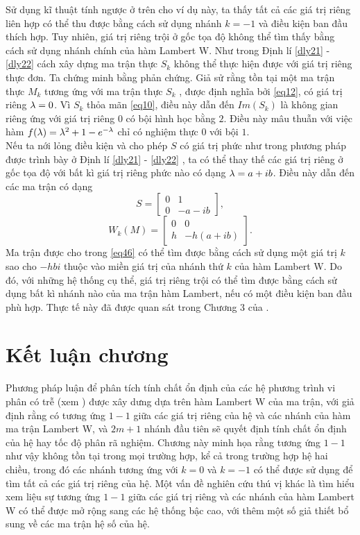 Sử dụng kĩ thuật tính ngược ở trên cho ví dụ này, ta thấy tất cả các giá trị riêng liên hợp có thể thu được bằng cách sử dụng nhánh $k = -1$ và điều kiện ban đầu thích hợp. Tuy nhiên, giá trị riêng trội ở gốc tọa độ không thể tìm thấy bằng cách sử dụng nhánh chính của hàm Lambert W. Như trong Định lí \ref{dly21} - \ref{dly22} cách xây dựng ma trận thực $S_k$ không thể thực hiện được với giá trị riêng thực đơn. Ta chứng minh bằng phản chứng. Giả sử rằng tồn tại một ma trận thực $M_k$ tương ứng với ma trận thực $S_k$ , được định nghĩa bởi \eqref{eq12}, có giá trị riêng $\lambda = 0$. Vì $S_k$ thỏa mãn \eqref{eq10}, điều này dẫn đến $Im(S_k)$ là không gian riêng ứng với giá trị riêng $0$ có bội hình học bằng $2$. Điều này mâu thuẫn với việc hàm $f(\lambda) = \lambda^2 + 1 - e^{-\lambda}$ chỉ có nghiệm thực $0$ với bội $1$.\\
Nếu ta nới lỏng điều kiện và cho phép $S$ có giá trị phức như trong phương pháp được trình bày ở Định lí \ref{dly21} - \ref{dly22} , ta có thể thay thế các giá trị riêng ở gốc tọa độ với bất kì giá trị riêng phức nào có dạng $\lambda = a + ib$. Điều này dẫn đến các ma trận có dạng
\begin{equation}\label{eq45}
	S = \begin{bmatrix}
		0 & 1\\
		0 & - a - ib
	\end{bmatrix},
\end{equation}
\begin{equation}\label{eq46}
	W_k(M) = \begin{bmatrix}
		0 & 0\\
		h  & -h (a+ib)
	\end{bmatrix}.
\end{equation}
Ma trận được cho trong \eqref{eq46} có thể tìm được bằng cách sử dụng một giá trị $k$ sao cho $-h  bi$ thuộc vào miền giá trị của nhánh thứ $k$ của hàm Lambert W. Do đó, với những hệ thống cụ thể, giá trị riêng trội có thể tìm được bằng cách sử dụng bất kì nhánh nào của ma trận hàm Lambert, nếu có một điều kiện ban đầu phù hợp. Thực tế này đã được quan sát trong Chương 3 của \cite{YiDes10}.

\section{Kết luận chương }\label{sec7}
Phương pháp luận để phân tích tính chất ổn định của các hệ phương trình vi phân có trễ (xem \cite{Yi10}) được xây dưng dựa trên hàm Lambert W của ma trận, với giả định rằng có tương ứng $1-1$ giữa các giá trị riêng của hệ và các nhánh của hàm ma trận Lambert W, và $2m+1$ nhánh đầu tiên sẽ quyết định tính chất ổn định của hệ hay tốc độ phân rã nghiệm. 
Chương này minh họa rằng tương ứng $1-1$ như vậy không tồn tại trong mọi trường hợp, kể cả trong trường hợp hệ hai chiều, trong đó các nhánh tương ứng với $k = 0$ và $k = -1$ có thể được sử dụng 
để tìm tất cả các giá trị riêng của hệ. Một vấn đề nghiên cứu thú vị khác là tìm hiểu xem liệu sự tương ứng $1-1$ giữa các giá trị riêng và các nhánh của hàm Lambert W có thể được mở rộng sang các hệ thống bậc cao, với thêm một số giả thiết bổ sung về các ma trận hệ số của hệ.
